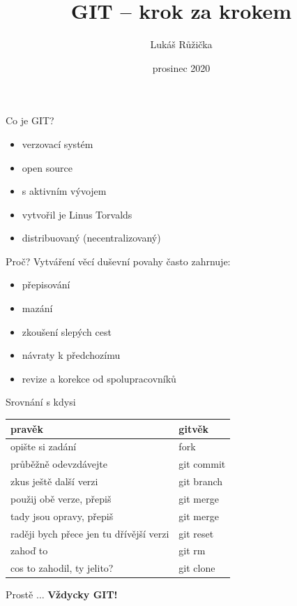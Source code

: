 \documentclass[14pt]{beamer}
\begin{document}
	\author{Lukáš Růžička}
	\title{GIT -- krok za krokem}
	\date{prosinec 2020}
	\begin{frame}[plain]
		\maketitle
	\end{frame}


	\begin{frame}{Co je GIT?}
	\begin{itemize}
		\item verzovací systém
		\item open source
		\item s aktivním vývojem
		\item vytvořil je Linus Torvalds
		\item distribuovaný (necentralizovaný)
	\end{itemize}
	\end{frame}


	\begin{frame}{Proč?}
	 Vytváření věcí duševní povahy často zahrnuje:
		\vspace{5pt}
		
	\begin{itemize}
		\item přepisování
		\item mazání
		\item zkoušení slepých cest
		\item návraty k předchozímu
		\item revize a korekce od spolupracovníků
	\end{itemize}
\end{frame}
		
\begin{frame}{Srovnání s kdysi}
	
	\begin{tabular}{l|l}
		\textbf{pravěk} & \textbf{gitvěk} \\
		\hline opište si zadání &  fork \\
		průběžně odevzdávejte & git commit \\
		zkus ještě další verzi & git branch \\
		použij obě verze, přepiš  & git merge \\
		tady jsou opravy, přepiš & git merge \\
		raději bych přece jen tu dřívější verzi & git reset \\
		zahoď to & git rm \\
        cos to zahodil, ty jelito? & git clone
	\end{tabular}
	
	\vspace{10pt}
		
	Prostě $\ldots${} \textbf{Vždycky GIT!}

\end{frame}
\end{document}
